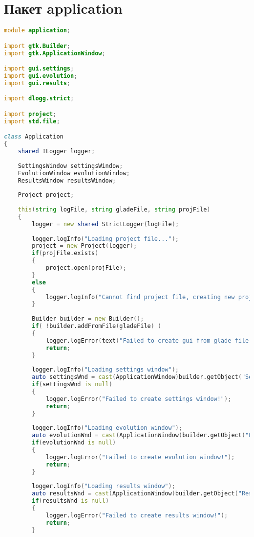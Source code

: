 \documentclass[russian,utf8,emptystyle]{eskdtext}
\begin{document}
\section{Пакет application}
\begin{lstlisting}[language=D]
module application;

import gtk.Builder;
import gtk.ApplicationWindow;

import gui.settings;
import gui.evolution;
import gui.results;

import dlogg.strict;

import project;
import std.file;

class Application
{
    shared ILogger logger;
    
    SettingsWindow settingsWindow;
    EvolutionWindow evolutionWindow;
    ResultsWindow resultsWindow;
    
    Project project;
    
    this(string logFile, string gladeFile, string projFile)
    {
        logger = new shared StrictLogger(logFile);
        
        logger.logInfo("Loading project file...");
        project = new Project(logger);
        if(projFile.exists)
        {
            project.open(projFile);
        } 
        else
        {
            logger.logInfo("Cannot find project file, creating new project");
        }
        
        Builder builder = new Builder();
        if( !builder.addFromFile(gladeFile) )
        {
            logger.logError(text("Failed to create gui from glade file '", gladeFile, "'!"));
            return;
        }
        
        logger.logInfo("Loading settings window");
        auto settingsWnd = cast(ApplicationWindow)builder.getObject("SettingsWindow");
        if(settingsWnd is null)
        {
            logger.logError("Failed to create settings window!");
            return;
        }
        
        logger.logInfo("Loading evolution window");
        auto evolutionWnd = cast(ApplicationWindow)builder.getObject("EvolutionWindow");
        if(evolutionWnd is null)
        {
            logger.logError("Failed to create evolution window!");
            return;
        }
        
        logger.logInfo("Loading results window");
        auto resultsWnd = cast(ApplicationWindow)builder.getObject("ResultsWindow");
        if(resultsWnd is null)
        {
            logger.logError("Failed to create results window!");
            return;
        }
        

\end{lstlisting}
\end{document}
